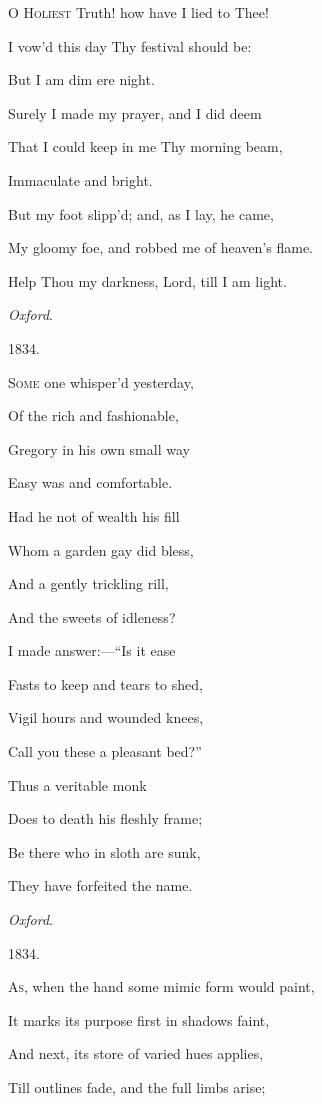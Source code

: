 O H\textsc{oliest} Truth! how have I lied to Thee!

I vow'd this day Thy festival should be:

But I
am dim ere night.

Surely I made my prayer, and I did deem

That I could keep in me Thy morning beam,

Immaculate and bright.

But my foot slipp'd; and, as I lay, he came,

My gloomy foe, and robbed me of heaven's flame.

Help Thou my darkness, Lord, till I am light.

\emph{Oxford}.

1834.


S\textsc{ome} one whisper'd yesterday,

Of the rich and fashionable,

Gregory in his own small way

Easy was and comfortable.

Had he not of wealth his fill

Whom a garden gay did bless,

And a gently trickling rill,

And the sweets of idleness?

I made answer:—``Is it ease

Fasts to keep and tears to shed,

Vigil hours and wounded knees,

Call you these a pleasant bed?''

Thus a veritable monk

Does to death his fleshly frame;

Be there who in sloth are sunk,

They have forfeited the name.

\emph{Oxford}.

1834.


A\textsc{s}, when the hand some mimic form would paint,

It marks its purpose first in shadows faint,

And next, its store of varied hues applies,

Till outlines fade, and the full limbs arise;

